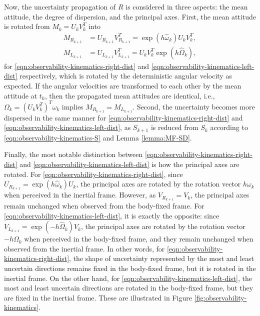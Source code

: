 Now, the uncertainty propagation of $R$ is considered in three aspects: the mean attitude, the degree of dispersion, and the principal axes. 
First, the mean attitude is rotated from $M_k = U_k V_k^T$ into
\begin{align}
	M_{R_{k+1}} &= U_{R_{k+1}} V_{R_{k+1}}^T = \exp(h\hat\omega_k ) U_k V_k^T, \label{eqn:M_kp_R} \\
	M_{L_{k+1}} &= U_{L_{k+1}} V_{L_{k+1}}^T =  U_k V_k^T \exp(h\hat\Omega_k), \label{eqn:M_kp_L}
\end{align}
for \eqref{eqn:observability-kinematics-right-dist} and \eqref{eqn:observability-kinematics-left-dist} respectively, which is rotated by the deterministic angular velocity as expected.
If the angular velocities are transformed to each other by the mean attitude at $t_k$, then the propagated mean attitudes are identical, i.e., 
$\Omega_k = (U_kV_k^T)^T \omega_k$ implies $M_{R_{k+1}} = M_{L_{k+1}}$.
Second, the uncertainty becomes more dispersed in the same manner for \eqref{eqn:observability-kinematics-right-dist} and \eqref{eqn:observability-kinematics-left-dist}, as $S_{k+1}$ is reduced from $S_k$ according to \eqref{eqn:observability-kinematics-S} and Lemma \ref{lemma:MF-SD}.

Finally, the most notable distinction between \eqref{eqn:observability-kinematics-right-dist} and \eqref{eqn:observability-kinematics-left-dist} is how the principal axes are rotated.
For \eqref{eqn:observability-kinematics-right-dist}, since $U_{R_{k+1}} = \exp(h\hat\omega_k) U_k$, the principal axes are rotated by the rotation vector $h\omega_k$ when perceived in the inertial frame.
However, as $V_{R_{k+1}} = V_k$, the principal axes remain unchanged when observed from the body-fixed frame.
For \eqref{eqn:observability-kinematics-left-dist}, it is exactly the opposite: since $V_{L_{k+1}} = \exp(-h\hat\Omega_k) V_k$, the principal axes are rotated by the rotation vector $-h\Omega_k$ when perceived in the body-fixed frame, and they remain unchanged when observed from the inertial frame.
In other words, for \eqref{eqn:observability-kinematics-right-dist}, the shape of uncertainty represented by the most and least uncertain directions remains fixed in the body-fixed frame, but it is rotated in the inertial frame.
On the other hand, for \eqref{eqn:observability-kinematics-left-dist}, the most and least uncertain directions are rotated in the body-fixed frame, but they are fixed in the inertial frame.
These are illustrated in Figure \ref{fig:observability-kinematics}.

